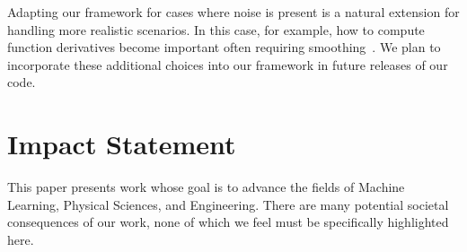 \documentclass{article}
\begin{document}



Adapting our framework for cases where noise is present is a natural extension for handling more realistic scenarios.
In this case, for example, how to compute function derivatives become important often requiring smoothing~\cite{Chartrand11}.
We plan to incorporate these additional choices into our framework in future releases of our code.


\section*{Impact Statement}

This paper presents work whose goal is to advance the fields of Machine Learning, Physical Sciences, and Engineering.
There are many potential societal consequences of our work, none of which we feel must be specifically highlighted here.



\end{document}
